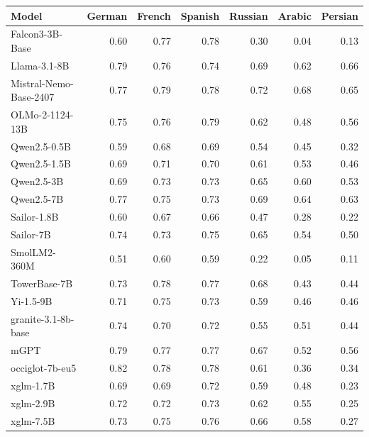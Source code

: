 \begin{center}\scriptsize
\begin{tabular}{lrrrrrr}
\toprule
Model & German & French & Spanish & Russian & Arabic & Persian \\
\midrule
Falcon3-3B-Base & 0.60 & 0.77 & 0.78 & 0.30 & 0.04 & 0.13 \\
Llama-3.1-8B & 0.79 & 0.76 & 0.74 & 0.69 & 0.62 & 0.66 \\
Mistral-Nemo-Base-2407 & 0.77 & 0.79 & 0.78 & 0.72 & 0.68 & 0.65 \\
OLMo-2-1124-13B & 0.75 & 0.76 & 0.79 & 0.62 & 0.48 & 0.56 \\
Qwen2.5-0.5B & 0.59 & 0.68 & 0.69 & 0.54 & 0.45 & 0.32 \\
Qwen2.5-1.5B & 0.69 & 0.71 & 0.70 & 0.61 & 0.53 & 0.46 \\
Qwen2.5-3B & 0.69 & 0.73 & 0.73 & 0.65 & 0.60 & 0.53 \\
Qwen2.5-7B & 0.77 & 0.75 & 0.73 & 0.69 & 0.64 & 0.63 \\
Sailor-1.8B & 0.60 & 0.67 & 0.66 & 0.47 & 0.28 & 0.22 \\
Sailor-7B & 0.74 & 0.73 & 0.75 & 0.65 & 0.54 & 0.50 \\
SmolLM2-360M & 0.51 & 0.60 & 0.59 & 0.22 & 0.05 & 0.11 \\
TowerBase-7B & 0.73 & 0.78 & 0.77 & 0.68 & 0.43 & 0.44 \\
Yi-1.5-9B & 0.71 & 0.75 & 0.73 & 0.59 & 0.46 & 0.46 \\
granite-3.1-8b-base & 0.74 & 0.70 & 0.72 & 0.55 & 0.51 & 0.44 \\
mGPT & 0.79 & 0.77 & 0.77 & 0.67 & 0.52 & 0.56 \\
occiglot-7b-eu5 & 0.82 & 0.78 & 0.78 & 0.61 & 0.36 & 0.34 \\
xglm-1.7B & 0.69 & 0.69 & 0.72 & 0.59 & 0.48 & 0.23 \\
xglm-2.9B & 0.72 & 0.72 & 0.73 & 0.62 & 0.55 & 0.25 \\
xglm-7.5B & 0.73 & 0.75 & 0.76 & 0.66 & 0.58 & 0.27 \\
\bottomrule
\end{tabular}
\end{center}
